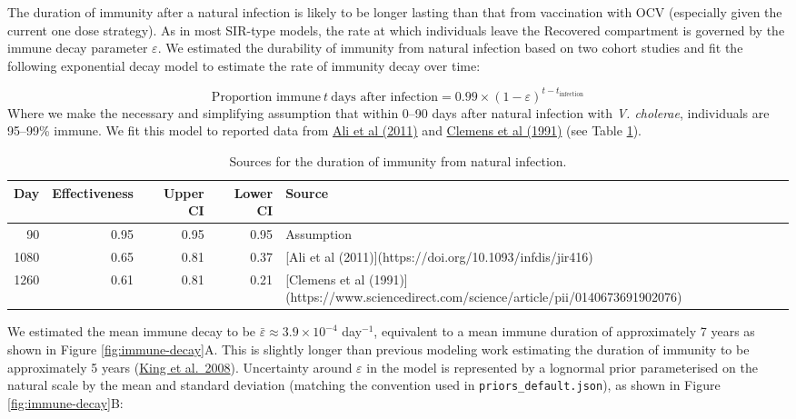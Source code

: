 \documentclass[
]{book}
\begin{document}
The duration of immunity after a natural infection is likely to be longer lasting than that from vaccination with OCV (especially given the current one dose strategy). As in most SIR-type models, the rate at which individuals leave the Recovered compartment is governed by the immune decay parameter \(\varepsilon\). We estimated the durability of immunity from natural infection based on two cohort studies and fit the following exponential decay model to estimate the rate of immunity decay over time:

\[
\text{Proportion immune}\ t \ \text{days after infection} = 0.99 \times (1 - \varepsilon) ^ {t-t_{\text{infection}}}
\]
Where we make the necessary and simplifying assumption that within 0--90 days after natural infection with \emph{V. cholerae}, individuals are 95--99\% immune. We fit this model to reported data from \href{https://doi.org/10.1093/infdis/jir416}{Ali et al (2011)} and \href{https://www.sciencedirect.com/science/article/pii/0140673691902076}{Clemens et al (1991)} (see Table \ref{tab:immunity-sources}).

\begin{table}

\caption{\label{tab:immunity-sources}Sources for the duration of immunity from natural infection.}
\centering
\begin{tabular}[t]{r|r|r|r|l}
\hline
Day & Effectiveness & Upper CI & Lower CI & Source\\
\hline
90 & 0.95 & 0.95 & 0.95 & Assumption\\
\hline
1080 & 0.65 & 0.81 & 0.37 & [Ali et al (2011)](https://doi.org/10.1093/infdis/jir416)\\
\hline
1260 & 0.61 & 0.81 & 0.21 & [Clemens et al (1991)](https://www.sciencedirect.com/science/article/pii/0140673691902076)\\
\hline
\end{tabular}
\end{table}

We estimated the mean immune decay to be \(\bar\varepsilon \approx 3.9 \times 10^{-4}\) day\(^{-1}\), equivalent to a mean immune duration of approximately 7 years as shown in Figure \ref{fig:immune-decay}A. This is slightly longer than previous modeling work estimating the duration of immunity to be approximately 5 years (\href{https://www.nature.com/articles/nature07084}{King et al.~2008}). Uncertainty around \(\varepsilon\) in the model is represented by a lognormal prior parameterised on the natural scale by the mean and standard deviation (matching the convention used in \texttt{priors\_default.json}), as shown in Figure \ref{fig:immune-decay}B:
\end{document}
